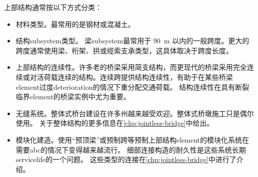 上部结构通常按以下方式分类：
\begin{itemize}
  \item 材料类型。最常用的是钢材或混凝土。
  \item 结构\gls*{subsystem}类型。 梁\gls*{subsystem}最常用于 \qty{90}{m} 以内的一般跨度。更大的跨度通常使用梁、桁架、拱或缆索支承类型，这具体取决于跨度长度。
  \item 上部结构的连续性。许多老的桥梁采用简支结构，而更现代的桥梁采用完全连续或对活荷载连续的结构。连续跨提供结构连续性，有助于在某些桥梁\gls*{element}过度\gls*{deterioration}的情况下重分配交通荷载。 结构连续性在具有断裂临界\gls*{element}的桥梁实例中尤为重要。
  \item 无缝系统。整体式桥台建设在许多州越来越受欢迎。整体式桥墩施工只是偶尔使用。 关于整体结构的更多信息在\cref{chp:jointless-bridge}中给出。
  \item 模块化建造。使用“预顶梁”或预制跨等预制上部结构\gls*{element}的模块化系统在需要\acrlong*{abc}的情况下变得越来越流行。 细部连接构造的耐久性是这些系统长期\gls*{servicelife}的一个问题。 这些类型的连接在\cref{chp:jointless-bridge}中进行了介绍。
\end{itemize}

